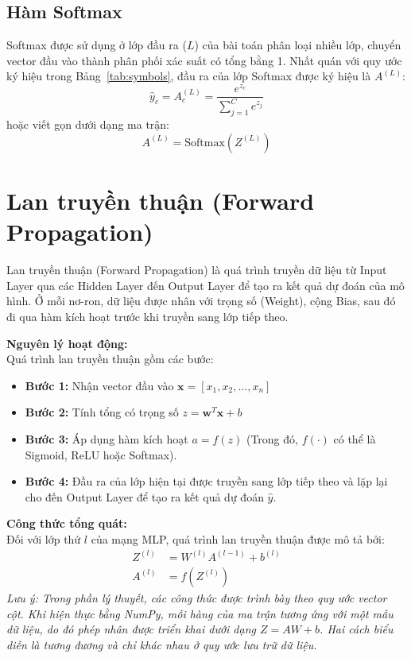 \documentclass[12pt,a4paper]{report}
\begin{document}
\subsection{Hàm Softmax}
Softmax được sử dụng ở lớp đầu ra ($L$) của bài toán phân loại nhiều lớp, chuyển vector đầu vào thành phân phối xác suất có tổng bằng 1. Nhất quán với quy ước ký hiệu trong Bảng~\ref{tab:symbols}, đầu ra của lớp Softmax được ký hiệu là $A^{(L)}$:
\begin{equation}
    \hat{y}_c = A^{(L)}_c = \frac{e^{z_c}}{\sum_{j=1}^C e^{z_j}}
\end{equation}
hoặc viết gọn dưới dạng ma trận:
\begin{equation}
    A^{(L)} = \mathrm{Softmax}\!\left(Z^{(L)}\right)
\end{equation}

\section{Lan truyền thuận (Forward Propagation)}
Lan truyền thuận (Forward Propagation) là quá trình truyền dữ liệu từ Input Layer qua các Hidden Layer đến Output Layer để tạo ra kết quả dự đoán của mô hình. Ở mỗi nơ-ron, dữ liệu được nhân với trọng số (Weight), cộng Bias, sau đó đi qua hàm kích hoạt trước khi truyền sang lớp tiếp theo.

\textbf{Nguyên lý hoạt động:} \\
Quá trình lan truyền thuận gồm các bước:
\begin{itemize}
    \item \textbf{Bước 1:} Nhận vector đầu vào $\mathbf{x} = [x_1, x_2, \dots, x_n]$
    \item \textbf{Bước 2:} Tính tổng có trọng số $z = \mathbf{w}^T \mathbf{x} + b$
    \item \textbf{Bước 3:} Áp dụng hàm kích hoạt $a = f(z)$ (Trong đó, $f(\cdot)$ có thể là Sigmoid, ReLU hoặc Softmax).
    \item \textbf{Bước 4:} Đầu ra của lớp hiện tại được truyền sang lớp tiếp theo và lặp lại cho đến Output Layer để tạo ra kết quả dự đoán $\hat{y}$.
\end{itemize}

\textbf{Công thức tổng quát:} \\
Đối với lớp thứ $l$ của mạng MLP, quá trình lan truyền thuận được mô tả bởi:
\begin{align}
    Z^{(l)} &= W^{(l)} A^{(l-1)} + b^{(l)} \\
    A^{(l)} &= f\left(Z^{(l)}\right)
\end{align}
\textit{Lưu ý: Trong phần lý thuyết, các công thức được trình bày theo quy ước vector cột. Khi hiện thực bằng NumPy, mỗi hàng của ma trận tương ứng với một mẫu dữ liệu, do đó phép nhân được triển khai dưới dạng $Z = AW + b$. Hai cách biểu diễn là tương đương và chỉ khác nhau ở quy ước lưu trữ dữ liệu.}
\end{document}
